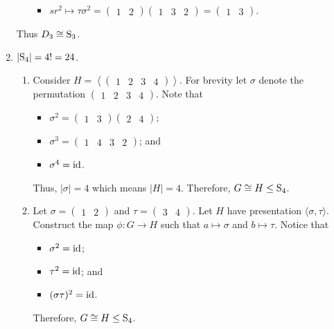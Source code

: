 \begin{enumerate}
\begin{itemize}
\begin{itemize}
            \item $sr^2 \mapsto \tau\sigma^2 = \begin{pmatrix}1 & 2\end{pmatrix}\begin{pmatrix}1 & 3 & 2\end{pmatrix} = \begin{pmatrix}1 & 3\end{pmatrix}$.
        \end{itemize}
    \end{itemize}
    Thus $D_3 \cong \mathrm{S}_{3}$.

    \item $|\mathrm{S}_{4}| = 4! = 24$.
    \begin{enumerate}[label=(\alph*)]
        \item Consider $H = \left\langle \begin{pmatrix}1 & 2 & 3 & 4\end{pmatrix} \right\rangle$. For brevity let $\sigma$ denote the permutation $\begin{pmatrix}1 & 2 & 3 & 4\end{pmatrix}$. Note that
        \begin{itemize}
            \item $\sigma^2 = \begin{pmatrix}1 & 3\end{pmatrix}\begin{pmatrix}2 & 4\end{pmatrix}$;
            \item $\sigma^3 = \begin{pmatrix}1 & 4 & 3 & 2\end{pmatrix}$; and
            \item $\sigma^4 = \mathrm{id}$.
        \end{itemize}
        Thus, $|\sigma| = 4$ which means $|H| = 4$. Therefore, $G \cong H \leq \mathrm{S}_{4}$.

        \item Let $\sigma = \begin{pmatrix}1 & 2\end{pmatrix}$ and $\tau = \begin{pmatrix}3 & 4\end{pmatrix}$. Let $H$ have presentation $\langle \sigma, \tau \rangle$. Construct the map $\phi: G \to H$ such that $a \mapsto \sigma$ and $b \mapsto \tau$. Notice that
        \begin{itemize}
            \item $\sigma^2 = \mathrm{id}$;
            \item $\tau^2 = \mathrm{id}$; and
            \item $(\sigma\tau)^2 = \mathrm{id}$.
        \end{itemize}
        Therefore, $G \cong H \leq \mathrm{S}_{4}$.
    \end{enumerate}
\end{enumerate}

